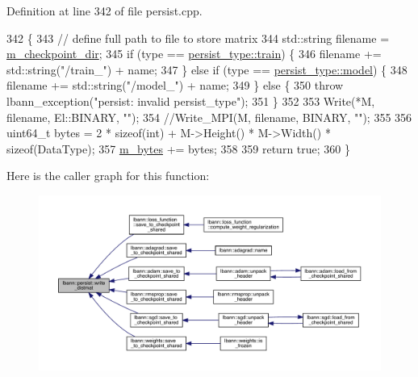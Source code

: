 Definition at line 342 of file persist.\+cpp.


\begin{DoxyCode}
342                                                                                 \{
343   \textcolor{comment}{// define full path to file to store matrix}
344   std::string filename = \hyperlink{classlbann_1_1persist_a17c2b08ec1815aba6d3eae6502397bb1}{m\_checkpoint\_dir};
345   \textcolor{keywordflow}{if} (type == \hyperlink{namespacelbann_adee41f31f15f3906cbdcce4a1417eb56a61b3a8faa9c1091806675c230a9abe64}{persist\_type::train}) \{
346     filename += std::string(\textcolor{stringliteral}{"/train\_"}) + name;
347   \} \textcolor{keywordflow}{else} \textcolor{keywordflow}{if} (type == \hyperlink{namespacelbann_adee41f31f15f3906cbdcce4a1417eb56a20f35e630daf44dbfa4c3f68f5399d8c}{persist\_type::model}) \{
348     filename += std::string(\textcolor{stringliteral}{"/model\_"}) + name;
349   \} \textcolor{keywordflow}{else} \{
350     \textcolor{keywordflow}{throw} lbann\_exception(\textcolor{stringliteral}{"persist: invalid persist\_type"});
351   \}
352 
353   Write(*M, filename, El::BINARY, \textcolor{stringliteral}{""});
354   \textcolor{comment}{//Write\_MPI(M, filename, BINARY, "");}
355 
356   uint64\_t bytes = 2 * \textcolor{keyword}{sizeof}(int) + M->Height() * M->Width() * \textcolor{keyword}{sizeof}(DataType);
357   \hyperlink{classlbann_1_1persist_a0bd4fd42d9858a5210c8034dfbb666d4}{m\_bytes} += bytes;
358 
359   \textcolor{keywordflow}{return} \textcolor{keyword}{true};
360 \}
\end{DoxyCode}
Here is the caller graph for this function\+:\nopagebreak
\begin{figure}[H]
\begin{center}
\leavevmode
\includegraphics[width=350pt]{classlbann_1_1persist_a9170de652405d86d9ba9b3793f8781c6_icgraph}
\end{center}
\end{figure}
\mbox{\label{classlbann_1_1persist_ad29ebcbacdef90a91a9d474d4d6e1bcd}} 
